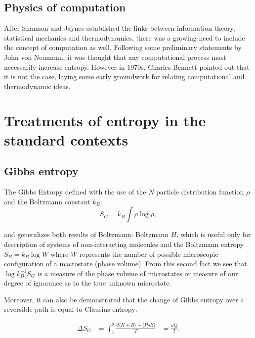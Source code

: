 \documentclass[a4paper,12pt]{article}
\begin{document}
\subsection{Physics of computation}

After Shannon and Jaynes established the links between information theory, statistical mechanics and thermodynamics, there was a growing need to include the concept of computation as well. Following some preliminary statements by John von Neumann, it was thought that any computational process must necessarily increase entropy.
However in 1970s, Charles Bennett pointed out that it is not the case\cite{Bennett:1973ko}, laying some early groundwork for relating computational and thermodynamic ideas. 


\section{Treatments of entropy in the standard contexts}

\subsection{Gibbs entropy}
\label{Gibbs entropy}
The Gibbs Entropy defined with the use of the $N$ particle distribution function $ \rho $ and the Boltzmann constant $k_B$:
\begin{equation}
  S_G = k_B \int \rho \log{\rho},
\end{equation}

and generalizes both results of Boltzmann:
Boltzmann $H$, which is useful only for description of systems of non-interacting molecules\cite{Jaynes:1965gg} and the Boltzmann entropy $S_B = k_B \log{W}$ where $W$ represents the number of possible microscopic configuration of a macrostate (phase volume). 
From this second fact we see that $\log{k_B^{-1} S_G}$ is a measure of the phase volume of microstates or measure of our degree of ignorance as to the true unknown microstate.

Moreover, it can also be demonstrated\cite{Jaynes:1965gg} that the change of Gibbs entropy over a reversible path is equal to Clausius entropy:

\begin{equation}
\begin{aligned}
  \Delta S_G &= \int_1^2 \frac{d\langle K+ B \rangle+ \langle P \rangle d\Omega}{T}
  &= \frac{dQ}{T}.
\end{aligned}
\end{equation}
\end{document}
